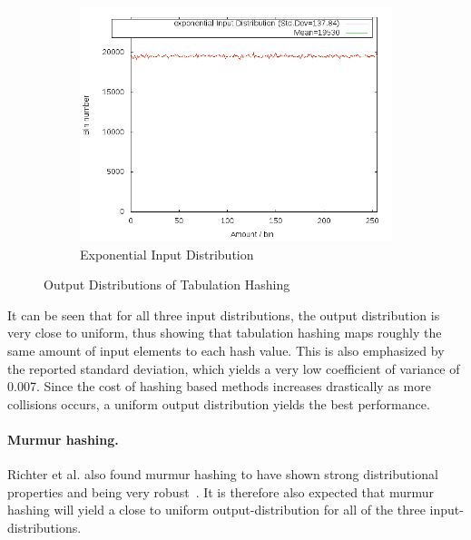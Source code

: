 \documentclass[11pt]{article} %
\begin{document}
\begin{figure}[H]\ContinuedFloat
  \centering
  \begin{subfigure}[b]{0.45\textwidth}
    \includegraphics[width=\textwidth]{Graphs/Dist/Tabulation_exponential_dist.png}
    \caption{Exponential Input Distribution}
    \label{fig:tab_dist_exp}
  \end{subfigure}
  \caption{Output Distributions of Tabulation Hashing}\label{fig:tab_dist}
\end{figure}
It can be seen that for all three input distributions, the output distribution is very close to uniform, thus showing that tabulation hashing maps roughly the same amount of input elements to each hash value. This is also emphasized by the reported standard deviation, which yields a very low coefficient of variance of 0.007. Since the cost of hashing based methods increases drastically as more collisions occurs, a uniform output distribution yields the best performance. 

\paragraph{Murmur hashing.} Richter et al. also found murmur hashing to have shown strong distributional properties and being very robust~\cite{RAD15}. It is therefore also expected that murmur hashing will yield a close to uniform output-distribution for all of the three input-distributions.\\
\end{document}
